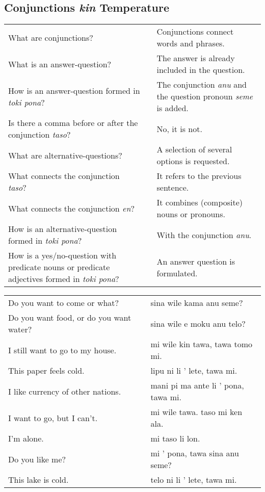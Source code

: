 \newpage
%
\subsection*{Conjunctions \textit{kin} Temperature} 
\label{'conjunctions_temperature'}
%
\begin{supertabular}{p{5,5cm}|ll}
What are conjunctions? && Conjunctions connect words and phrases. \\ %
What is an answer-question? && The answer is already included in the question. \\ %
How is an answer-question formed in \textit{toki pona}? && The conjunction \textit{anu} and the question pronoun \textit{seme} is added. \\ %
Is there a comma before or after the conjunction \textit{taso}? && No, it is not. \\ %
What are alternative-questions? && A selection of several options is requested.  \\ %
What connects the conjunction \textit{taso}? && It refers to the previous sentence.  \\ %
What connects the conjunction \textit{en}? && It combines (composite) nouns or pronouns. \\ %
How is an alternative-question formed in \textit{toki pona}? && With the conjunction \textit{anu}. \\ %
How is a yes/no-question with predicate nouns or predicate adjectives formed in \textit{toki pona}? && An answer question is formulated. \\ %
\end{supertabular}

\begin{supertabular}{p{5,5cm}|ll}
Do you want to come or what?  && sina wile kama anu seme? \\ %
Do you want food, or do you want water?  && sina wile e moku anu telo? \\ %
I still want to go to my house.  && mi wile kin tawa, tawa tomo mi. \\ %
This paper feels cold.  && lipu ni li ' lete, tawa mi. \\ %
I like currency of other nations.  && mani pi ma ante li ' pona, tawa mi. \\ %
I want to go, but I can't.  && mi wile tawa. taso mi ken ala. \\ %
I'm alone.  && mi taso li lon. \\ %
Do you like me?  && mi ' pona, tawa sina anu seme? \\ %
This lake is cold. && telo ni li ' lete, tawa mi. \\ %
\end{supertabular}  

